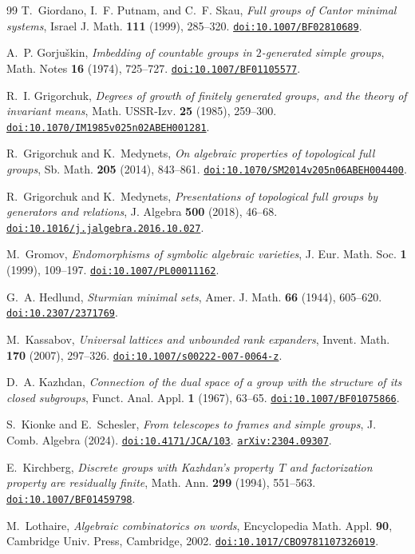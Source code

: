 \documentclass[11pt]{amsart}
\newcommand{\doi}[1]{\href{https://doi.org/#1}{\nolinkurl{doi:#1}}}
\newcommand{\arxiv}[1]{\href{https://arxiv.org/abs/#1}{\nolinkurl{arXiv:#1}}}
\begin{document}
\begin{thebibliography}{99}
T.~Giordano, I.~F. Putnam, and C.~F. Skau,
\emph{Full groups of Cantor minimal systems},
Israel J. Math. \textbf{111} (1999), 285--320.
\doi{10.1007/BF02810689}.

A.~P. Gorju\v{s}kin, \emph{Imbedding of countable groups in
$2$-generated simple groups}, Math. Notes \textbf{16} (1974), 725--727.
\doi{10.1007/BF01105577}.

R.~I. Grigorchuk, \emph{Degrees of growth of finitely generated groups,
and the theory of invariant means}, Math. USSR-Izv. \textbf{25} (1985),
259--300. \doi{10.1070/IM1985v025n02ABEH001281}.

R.~Grigorchuk and K.~Medynets,
\emph{On algebraic properties of topological full groups},
Sb. Math. \textbf{205} (2014), 843--861.
\doi{10.1070/SM2014v205n06ABEH004400}.

R.~Grigorchuk and K.~Medynets,
\emph{Presentations of topological full groups by generators and
relations}, J. Algebra \textbf{500} (2018), 46--68.
\doi{10.1016/j.jalgebra.2016.10.027}.

M.~Gromov, \emph{Endomorphisms of symbolic algebraic varieties},
J. Eur. Math. Soc. \textbf{1} (1999), 109--197.
\doi{10.1007/PL00011162}.

G.~A. Hedlund, \emph{Sturmian minimal sets},
Amer. J. Math. \textbf{66} (1944), 605--620.
\doi{10.2307/2371769}.

M.~Kassabov, \emph{Universal lattices and unbounded rank expanders},
Invent. Math. \textbf{170} (2007), 297--326.
\doi{10.1007/s00222-007-0064-z}.

D.~A. Kazhdan, \emph{Connection of the dual space of a group with the
structure of its closed subgroups}, Funct. Anal. Appl. \textbf{1} (1967),
63--65. \doi{10.1007/BF01075866}.

S.~Kionke and E.~Schesler,
\emph{From telescopes to frames and simple groups},
J. Comb. Algebra (2024). \doi{10.4171/JCA/103}.
\arxiv{2304.09307}.

E.~Kirchberg, \emph{Discrete groups with Kazhdan's property~$T$ and
factorization property are residually finite},
Math. Ann. \textbf{299} (1994), 551--563.
\doi{10.1007/BF01459798}.

M.~Lothaire, \emph{Algebraic combinatorics on words}, Encyclopedia Math.
Appl. \textbf{90}, Cambridge Univ. Press, Cambridge, 2002.
\doi{10.1017/CBO9781107326019}.


\end{thebibliography}
\end{document}
